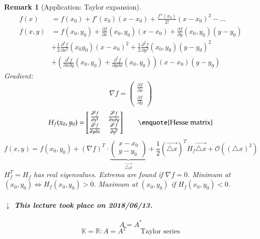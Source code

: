 \documentclass[a4paper]{article}
\numberwithin{lecref}{section}
\newtheorem*{Remark}{Remark}
\newcommand{\dateref}[1]{%
  \begin{mdframed}[backgroundcolor=gray!10,innerbottommargin=0pt,innertopmargin=0pt]
    \paragraph{\textit{$\downarrow$ This lecture took place on #1.}}%
  \end{mdframed}%
}
\begin{document}
\begin{Remark}[Application: Taylor expansion]
  \begin{align*}
    f(x) &= f(x_0) + f'(x_0)(x - x_0) + \frac{f''(x_0)}{2!} (x - x_0)^2 - \dots \\
    f(x,y) &= f(x_0, y_0) + \frac{\partial f}{\partial x} (x_0, y_0)(x - x_0) + \frac{\partial f}{\partial y} (x_0, y_0)(y - y_0) \\
      &+ \frac12 \frac{\partial^2 f}{\partial x^2} (x_0 y_0)(x - x_0)^2 + \frac12 \frac{\partial^2 f}{\partial y^2} (x_0, y_0) (y - y_0)^2 \\
      &+ \left(\frac{\partial^2 f}{\partial x \partial y} (x_0, y_0) + \frac{\partial^2 f}{\partial y \partial x} (x_0, y_0)\right) (x - x_0) (y - y_0)
  \end{align*}
  Gradient:
  \[ \nabla f = \begin{pmatrix} \frac{\partial f}{\partial x} \\ \frac{\partial f}{\partial y} \end{pmatrix} \]
  \[ H_f(x_0, y_0) = \begin{bmatrix}
      \frac{\partial^2 f}{\partial x^2} & \frac{\partial^2 f}{\partial x \partial y} \\
      \frac{\partial^2 f}{\partial y \partial x} & \frac{\partial^2 f}{\partial y^2}
    \end{bmatrix} \qquad \text{\enquote{Hesse matrix}}
  \] \[
    f(x, y) = f(x_0, y_0) + (\nabla f)^T \cdot \underbrace{\begin{pmatrix} x - x_0 \\ y - y_0 \end{pmatrix}}_{\vec{\triangle x}}
    + \frac12 (\vec{\triangle x})^T H_f \vec{\triangle x} + \mathcal O((\triangle x)^2)
  \]
  $H_f^T = H_f$ has real eigenvalues. Extrema are found if $\nabla f = 0$.
  Minimum at $(x_0, y_0) \iff H_f(x_0, y_0) > 0$. Maximum at $(x_0, y_0)$ if $H_f(x_0, y_0) < 0$.
\end{Remark}

\dateref{2018/06/13}

\[ A = A^* \]
\[ \mathbb K = \mathbb R: A = A^T \qquad \text{Taylor series} \]
\end{document}
